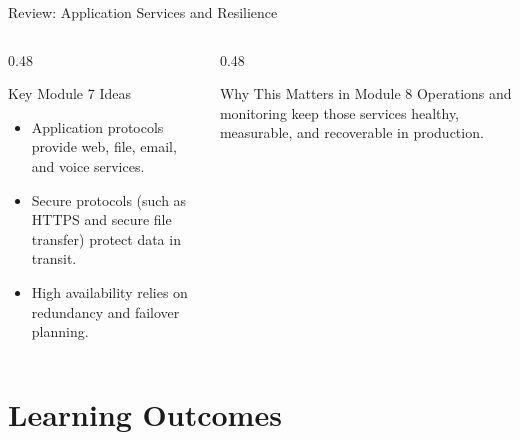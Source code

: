 \documentclass[aspectratio=169]{beamer}  %
\begin{document}
\begin{frame}{Review: Application Services and Resilience}
    \begin{columns}[T]
        \begin{column}{0.48\textwidth}
            \begin{block}{Key Module 7 Ideas}
                \begin{itemize}
                    \item Application protocols provide web, file, email, and voice services.
                    \item Secure protocols (such as HTTPS and secure file transfer) protect data in transit.
                    \item High availability relies on redundancy and failover planning.
                \end{itemize}
            \end{block}
        \end{column}
        \begin{column}{0.48\textwidth}
            \begin{alertblock}{Why This Matters in Module 8}
                Operations and monitoring keep those services healthy, measurable, and recoverable in production.
            \end{alertblock}
        \end{column}
    \end{columns}
\end{frame}

\section*{Learning Outcomes}
\end{document}

